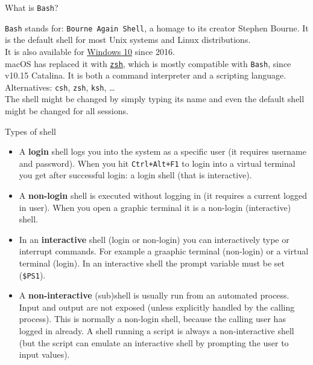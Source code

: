 \documentclass{beamer}
\begin{document}
\begin{frame}{What is \texttt{Bash}?}

  \texttt{Bash} stands for: \texttt{Bourne Again Shell}, a homage to its creator Stephen Bourne.
  \vfill
  It is the default shell for most Unix systems and Linux distributions. \\
  It is also available for \href{https://docs.microsoft.com/it-it/windows/wsl/about}{Windows 10} since 2016. \\
  macOS has replaced it with \href{https://support.apple.com/en-us/HT208050}{\texttt{zsh}}, which is mostly compatible with \texttt{Bash}, since v10.15 Catalina.
  \vfill
  It is both a command interpreter and a scripting language.
  \vfill
  Alternatives: \texttt{csh}, \texttt{zsh}, \texttt{ksh}, \dots\\
  The shell might be changed by simply typing its name and even the default shell might be changed for all sessions.
\end{frame}

\begin{frame}{Types of shell}
    \small
    \begin{itemize}
        \item A \textbf{login} shell logs you into the system as a specific user (it requires username and password). When you hit \texttt{Ctrl+Alt+F1} to login into a virtual terminal you get after successful login: a login shell (that is interactive).
        \item A \textbf{non-login} shell is executed without logging in (it requires a current logged in user). When you open a graphic terminal it is a non-login (interactive) shell. 
        \item In an \textbf{interactive} shell (login or non-login) you can interactively type or interrupt commands. For example a graaphic terminal (non-login) or a virtual terminal (login). In an interactive shell the prompt variable must be set (\texttt{\$PS1}).
        \item A \textbf{non-interactive} (sub)shell is usually run from an automated process. Input and output are not exposed (unless explicitly handled by the calling process). This is normally a non-login shell, because the calling user has logged in already. A shell running a script is always a non-interactive shell (but the script can emulate an interactive shell by prompting the user to input values).
    \end{itemize}
\end{frame}
\end{document}
